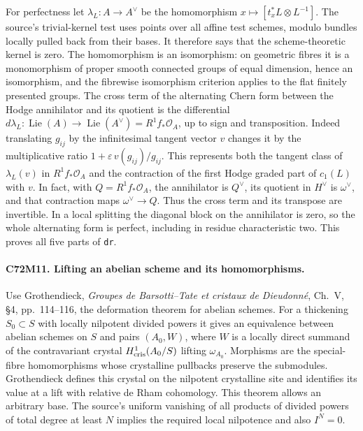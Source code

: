 For perfectness let $\lambda_L:A\to A^\vee$ be the homomorphism
$x\mapsto[t_x^*L\otimes L^{-1}]$. The source's trivial-kernel
test uses points over all affine test schemes, modulo bundles locally
pulled back from their bases. It therefore says that the
scheme-theoretic kernel is zero. The homomorphism is an isomorphism:
on geometric fibres it is a monomorphism of proper smooth connected
groups of equal dimension, hence an isomorphism, and the fibrewise
isomorphism criterion applies to the flat finitely presented groups.
The cross term of the alternating Chern form between the Hodge
annihilator and its quotient is the differential
$d\lambda_L:\operatorname{Lie}(A)\to\operatorname{Lie}(A^\vee)
=R^1 f_*\mathcal O_A$, up to sign and transposition. Indeed translating
$g_{ij}$ by the infinitesimal tangent vector $v$ changes it by
the multiplicative ratio $1+\varepsilon\,v(g_{ij})/g_{ij}$.
This represents both the tangent class of $\lambda_L(v)$ in
$R^1 f_*\mathcal O_A$ and the contraction of the first Hodge
graded part of $c_1(L)$ with $v$. In fact, with $Q=R^1f_*\mathcal O_A$,
the annihilator is $Q^\vee$, its quotient in $H^\vee$ is
$\omega^\vee$, and that contraction maps $\omega^\vee\to Q$.
Thus the cross term and its
transpose are invertible. In a local splitting the diagonal block
on the annihilator is zero, so the whole alternating form is
perfect, including in residue characteristic two. This proves all
five parts of \texttt{dr}.

\paragraph{C72M11. Lifting an abelian scheme and its homomorphisms.}
Use Grothendieck, \emph{Groupes de Barsotti--Tate et cristaux de
Dieudonné}, Ch.~V, \S4, pp.~114--116, the deformation theorem
for abelian schemes. For a thickening $S_0\subset S$ with locally
nilpotent divided powers it gives an equivalence between abelian
schemes on $S$ and pairs $(A_0,W)$, where $W$ is a locally direct
summand of the contravariant crystal $H^1_{\rm cris}(A_0/S)$ lifting
$\omega_{A_0}$. Morphisms are the special-fibre homomorphisms whose
crystalline pullbacks preserve the submodules. Grothendieck defines
this crystal on the nilpotent crystalline site and identifies its value
at a lift with relative de Rham cohomology. This theorem allows an
arbitrary base. The source's uniform vanishing of all products of
divided powers of total degree at least $N$ implies the required
local nilpotence and also $I^N=0$.

